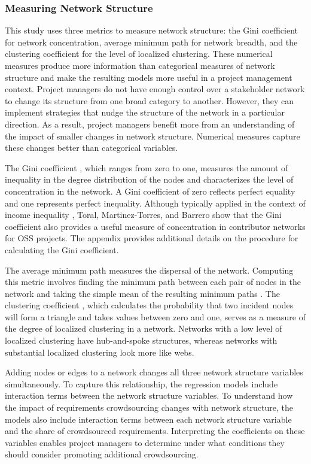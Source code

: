 \subsubsection{Measuring Network Structure}
\label{network_structure}

This study uses three metrics to measure network structure: the Gini coefficient for network concentration, average minimum path for network breadth, and the clustering coefficient for the level of localized clustering. These numerical measures produce more information than categorical measures of network structure and make the resulting models more useful in a project management context. Project managers do not have enough control over a stakeholder network to change its structure from one broad category to another. However, they can implement strategies that nudge the structure of the network in a particular direction. As a result, project managers benefit more from an understanding of the impact of smaller changes in network structure. Numerical measures capture these changes better than categorical variables.

The Gini coefficient \cite{gini, gini2}, which ranges from zero to one, measures the amount of inequality in the degree distribution of the nodes and characterizes the level of concentration in the network. A Gini coefficient of zero reflects perfect equality and one represents perfect inequality. Although typically applied in the context of income inequality \cite{gini2, yitzhaki}, Toral, Martinez-Torres, and Barrero \cite{toral} show that the Gini coefficient also provides a useful measure of concentration in contributor networks for OSS projects. The appendix provides additional details on the procedure for calculating the Gini coefficient.

The average minimum path \cite{holland} measures the dispersal of the network. Computing this metric involves finding the minimum path between each pair of nodes in the network and taking the simple mean of the resulting minimum paths \cite{holland}. The clustering coefficient \cite{holland}, which calculates the probability that two incident nodes will form a triangle and takes values between zero and one, serves as a measure of the degree of localized clustering in a network. Networks with a low level of localized clustering have hub-and-spoke structures, whereas networks with substantial localized clustering look more like webs.

Adding nodes or edges to a network changes all three network structure variables simultaneously. To capture this relationship, the regression models include interaction terms between the network structure variables. To understand how the impact of requirements crowdsourcing changes with network structure, the models also include interaction terms between each network structure variable and the share of crowdsourced requirements. Interpreting the coefficients on these variables enables project managers to determine under what conditions they should consider promoting additional crowdsourcing.

